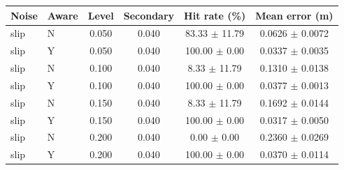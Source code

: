 \begin{tabular}{llcccc}
\hline
Noise & Aware & Level & Secondary & Hit rate (\%) & Mean error (m) \\
\hline
slip & N & 0.050 & 0.040 & 83.33 $\pm$ 11.79 & 0.0626 $\pm$ 0.0072 \\
slip & Y & 0.050 & 0.040 & 100.00 $\pm$ 0.00 & 0.0337 $\pm$ 0.0035 \\
slip & N & 0.100 & 0.040 & 8.33 $\pm$ 11.79 & 0.1310 $\pm$ 0.0138 \\
slip & Y & 0.100 & 0.040 & 100.00 $\pm$ 0.00 & 0.0377 $\pm$ 0.0013 \\
slip & N & 0.150 & 0.040 & 8.33 $\pm$ 11.79 & 0.1692 $\pm$ 0.0144 \\
slip & Y & 0.150 & 0.040 & 100.00 $\pm$ 0.00 & 0.0317 $\pm$ 0.0050 \\
slip & N & 0.200 & 0.040 & 0.00 $\pm$ 0.00 & 0.2360 $\pm$ 0.0269 \\
slip & Y & 0.200 & 0.040 & 100.00 $\pm$ 0.00 & 0.0370 $\pm$ 0.0114 \\
\hline
\end{tabular}
